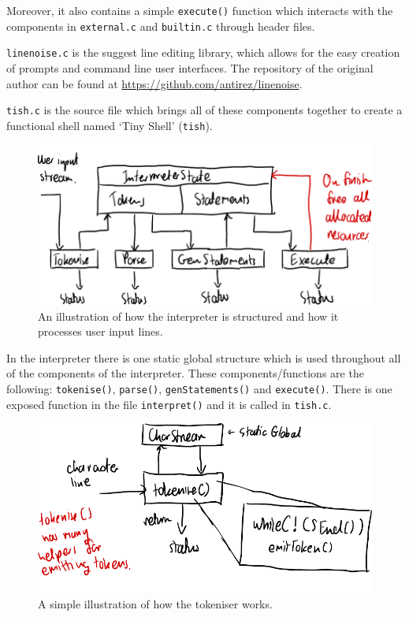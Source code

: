 \documentclass[12pt]{article}
\begin{document}
Moreover, it also contains a simple \texttt{execute()} function
which interacts with the components in \texttt{external.c} and
\texttt{builtin.c} through header files.

\texttt{linenoise.c} is the suggest line editing library, which
allows for the easy creation of prompts and command line user
interfaces. The repository of the original author can be found
at \url{https://github.com/antirez/linenoise}.

\texttt{tish.c} is the source file which brings all of these
components together to create a functional shell named `Tiny
Shell' (\texttt{tish}).

\begin{figure}[H]
\centering
\includegraphics{interpreter-arch}
\caption{An illustration of how the interpreter is structured
and how it processes user input lines.}
\end{figure}



In the interpreter there is one static global structure which is
used throughout all of the components of the interpreter. These
components/functions are the following: \texttt{tokenise()},
\texttt{parse()}, \texttt{genStatements()} and
\texttt{execute()}. There is one exposed function in the file
\texttt{interpret()} and it is called in \texttt{tish.c}.

\begin{figure}[H]
\centering
\includegraphics{tokeniser}
\caption{A simple illustration of how the tokeniser works.}
\end{figure}
\end{document}
